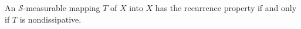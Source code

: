 An $\mathcal{S}$-measurable mapping $T$ of $X$ into $X$ has the recurrence property if and only if $T$ is nondissipative.
